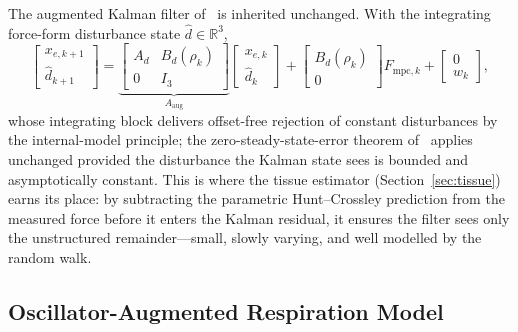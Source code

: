 The augmented Kalman filter of~\cite{cao2026phri} is inherited unchanged. With the integrating force-form disturbance state $\hat{d} \in \mathbb{R}^3$,
\begin{equation}
\begin{bmatrix} x_{e,k+1} \\ \hat{d} _{k+1} \end{bmatrix} 
= \underbrace{\begin{bmatrix} A_d & B_d(\rho_k) \\ 0 & I_3 \end{bmatrix}}_{A_{\text{aug}}} 
\begin{bmatrix} x_{e,k} \\ \hat{d} _{k} \end{bmatrix} + 
\begin{bmatrix} B_d(\rho_k) \\ 0 \end{bmatrix} F_{\text{mpc},k} + 
\begin{bmatrix} 0 \\ w_k \end{bmatrix},
\label{eq:aug}
\end{equation}
whose integrating block delivers offset-free rejection of constant disturbances by the internal-model principle; the zero-steady-state-error theorem of~\cite{cao2026phri} applies unchanged provided the disturbance the Kalman state sees is bounded and asymptotically constant. This is where the tissue estimator (Section~\ref{sec:tissue}) earns its place: by subtracting the parametric Hunt--Crossley prediction from the measured force before it enters the Kalman residual, it ensures the filter sees only the unstructured remainder---small, slowly varying, and well modelled by the random walk.

\subsection{Oscillator-Augmented Respiration Model}\label{sec:osc}

